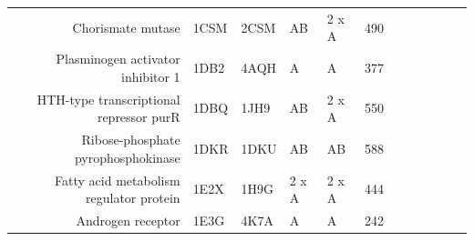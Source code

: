 \begin{table}
\begin{scriptsize}
\begin{tabular}{rrrrrrrrrrrr}
\multicolumn{1}{r}{Chorismate mutase} & \multicolumn{1}{l}{1CSM} & \multicolumn{1}{l}{2CSM} & \multicolumn{1}{l}{AB} & \multicolumn{1}{l}{2 x A} & 490   & \cellcolor[rgb]{ 1,  .494,  .475}  & \cellcolor[rgb]{ 1,  .494,  .475}  & \cellcolor[rgb]{ 1,  .494,  .475}  & \cellcolor[rgb]{ .573,  .816,  .314}  & \cellcolor[rgb]{ 1,  .494,  .475}  & \cellcolor[rgb]{ .573,  .816,  .314}  \\
\multicolumn{1}{r}{Plasminogen activator inhibitor 1} & \multicolumn{1}{l}{1DB2} & \multicolumn{1}{l}{4AQH} & \multicolumn{1}{l}{A} & \multicolumn{1}{l}{A} & 377   & \cellcolor[rgb]{ 1,  .494,  .475}  & \cellcolor[rgb]{ .573,  .816,  .314}  & \cellcolor[rgb]{ 1,  .494,  .475}  & \cellcolor[rgb]{ .573,  .816,  .314}  & \cellcolor[rgb]{ .573,  .816,  .314}  & \cellcolor[rgb]{ .573,  .816,  .314}  \\
\multicolumn{1}{r}{HTH-type transcriptional repressor purR} & \multicolumn{1}{l}{1DBQ} & \multicolumn{1}{l}{1JH9} & \multicolumn{1}{l}{AB} & \multicolumn{1}{l}{2 x A} & 550   & \cellcolor[rgb]{ .573,  .816,  .314}  & \cellcolor[rgb]{ 1,  .494,  .475}  & \cellcolor[rgb]{ 1,  .494,  .475}  & \cellcolor[rgb]{ 1,  .494,  .475}  & \cellcolor[rgb]{ 1,  .494,  .475}  & \cellcolor[rgb]{ 1,  .494,  .475}  \\
\multicolumn{1}{r}{Ribose-phosphate pyrophosphokinase} & \multicolumn{1}{l}{1DKR} & \multicolumn{1}{l}{1DKU} & \multicolumn{1}{l}{AB} & \multicolumn{1}{l}{AB} & 588   & \cellcolor[rgb]{ .573,  .816,  .314}  & \cellcolor[rgb]{ 1,  .494,  .475}  & \cellcolor[rgb]{ .573,  .816,  .314}  & \cellcolor[rgb]{ 1,  .494,  .475}  & \cellcolor[rgb]{ .573,  .816,  .314}  & \cellcolor[rgb]{ 1,  .494,  .475}  \\
\multicolumn{1}{r}{Fatty acid metabolism regulator protein} & \multicolumn{1}{l}{1E2X} & \multicolumn{1}{l}{1H9G} & \multicolumn{1}{l}{2 x A} & \multicolumn{1}{l}{2 x A} & 444   & \cellcolor[rgb]{ 1,  .494,  .475}  & \cellcolor[rgb]{ 1,  .494,  .475}  & \cellcolor[rgb]{ 1,  .494,  .475}  & \cellcolor[rgb]{ .573,  .816,  .314}  & \cellcolor[rgb]{ .573,  .816,  .314}  & \cellcolor[rgb]{ .573,  .816,  .314}  \\
\multicolumn{1}{r}{Androgen receptor} & \multicolumn{1}{l}{1E3G} & \multicolumn{1}{l}{4K7A} & \multicolumn{1}{l}{A} & \multicolumn{1}{l}{A} & 242   & \cellcolor[rgb]{ 1,  .494,  .475}  & \cellcolor[rgb]{ 1,  .494,  .475}  & \cellcolor[rgb]{ 1,  .494,  .475}  & \cellcolor[rgb]{ 1,  .494,  .475}  & \cellcolor[rgb]{ 1,  .494,  .475}  & \cellcolor[rgb]{ 1,  .494,  .475}  \\

\end{tabular}
\end{scriptsize}
\end{table}
